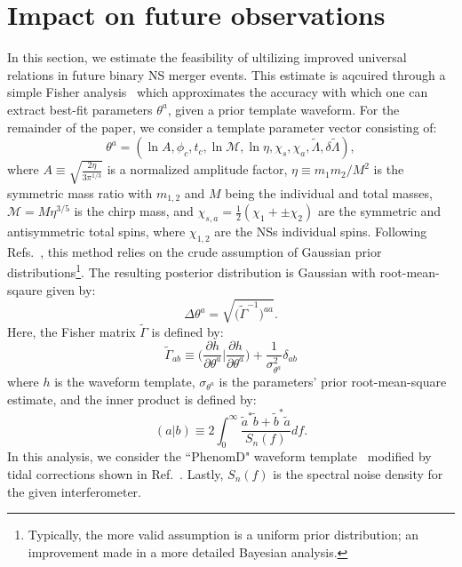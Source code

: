 \documentclass[prd,twocolumn,nofootinbib,superscriptaddress,amsmath,amssymb]{revtex4-1}
\begin{document}
\section{Impact on future observations}\label{sec:observations}
In this section, we estimate the feasibility of ultilizing improved universal relations in future binary NS merger events.
This estimate is aqcuired through a simple Fisher analysis~\cite{Finn:Fisher,Cutler:Fisher} which approximates the accuracy with which one can extract best-fit parameters $\theta^a$, given a prior template waveform.
For the remainder of the paper, we consider a template parameter vector consisting of:
\begin{equation}
\theta^a=(\ln{A},\phi_c,t_c,\ln{\mathcal{M}},\ln{\mathcal{\eta}},\chi_s,\chi_a,\tilde{\Lambda},\delta \tilde{\Lambda}),
\end{equation}
where $A \equiv \sqrt{\frac{2 \eta}{3 \pi^{1/3}}}$ is a normalized amplitude factor, $\eta \equiv m_1 m_2/M^2$ is the symmetric mass ratio with $m_{1,2}$ and $M$ being the individual and total masses, $\mathcal{M}=M \eta^{3/5}$ is the chirp mass, and $\chi_{s,a}=\frac{1}{2}(\chi_1+\pm\chi_2)$ are the symmetric and antisymmetric total spins, where $\chi_{1,2}$ are the NSs individual spins. 
Following Refs.~\cite{Cutler:Fisher,Berti:Fisher,Poisson:Fisher}, this method relies on the crude assumption of Gaussian prior distributions\footnote{Typically, the more valid assumption is a uniform prior distribution; an improvement made in a more detailed Bayesian analysis.}.
The resulting posterior distribution is Gaussian with root-mean-sqaure given by:
\begin{equation}
\Delta \theta^a=\sqrt{\Big( \tilde{\Gamma}^{-1}\Big)^{aa}}.
\end{equation}
Here, the Fisher matrix $\tilde{\Gamma}$ is defined by:
\begin{equation}
\tilde{\Gamma}_{ab} \equiv \Big( \frac{\partial h}{\partial \theta^a} \Big| \frac{\partial h}{\partial \theta^a}\Big) + \frac{1}{\sigma_{\theta^a}^2} \delta_{ab}
\end{equation}
where $h$ is the waveform template, $\sigma_{\theta^a}$ is the parameters' prior root-mean-square estimate, and the inner product is defined by:
\begin{equation}
(a|b) \equiv 2 \int^{\infty}_0\frac{\tilde{a}^*\tilde{b}+\tilde{b}^*\tilde{a}}{S_n(f)}df.
\end{equation}
In this analysis, we consider the ``PhenomD" waveform template~\cite{PhenomDI,PhenomDII} modified by tidal corrections shown in Ref.~\cite{Wade:tidalCorrections}.
Lastly, $S_n(f)$ is the spectral noise density for the given interferometer.
\end{document}

